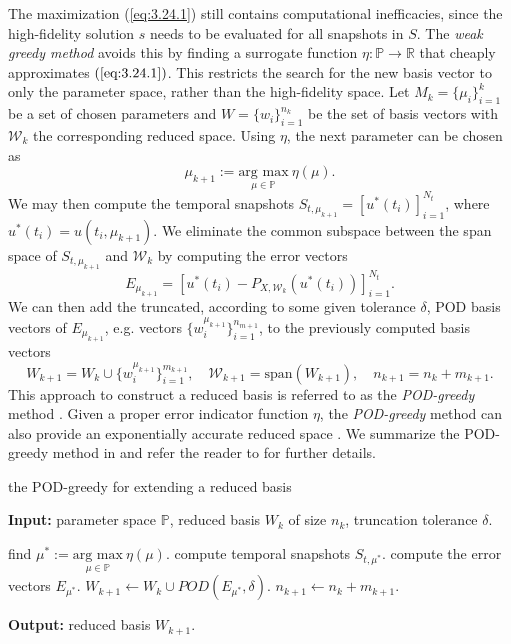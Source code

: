The maximization (\ref{eq:3.24.1}) still contains computational inefficacies, since the high-fidelity solution $s$ needs to be evaluated for all snapshots in $S$. The \emph{weak greedy method} avoids this by finding a surrogate function $\eta:\mathbb P \to \mathbb R$ that cheaply approximates $(\ref{eq:3.24.1})$. This restricts the search for the new basis vector to only the parameter space, rather than the high-fidelity space. Let $M_k=\{\mu_i\}_{i=1}^k$ be a set of chosen parameters and $W = \{ w_i\}_{i=1}^{n_k}$ be the set of basis vectors with $\mathcal W_k$ the corresponding reduced space. Using $\eta$, the next parameter can be chosen as
\begin{equation}
	\mu_{k+1} := \underset{\mu \in \mathbb P}{\text{arg\ max}} \ \eta(\mu).
\end{equation}
We may then compute the temporal snapshots $S_{t,\mu_{k+1}} = [ u^*(t_i) ]_{i=1}^{N_t}$, where $u^*(t_i) = u(t_i,\mu_{k+1})$. We eliminate the common subspace between the span space of $S_{t,\mu_{k+1}}$ and $\mathcal W_k$ by computing the error vectors 
\begin{equation}
	E_{\mu_{k+1}} = \left[ u^*(t_i) - P_{X,\mathcal W_k} (u^*(t_i)) \right]_{i=1}^{N_t}.
\end{equation}
We can then add the truncated, according to some given tolerance $\delta$, POD basis vectors of $E_{\mu_{k+1}}$, e.g. vectors $\{w^{\mu_{k+1}}_i\}_{i=1}^{n_{m+1}}$, to the previously computed basis vectors
\begin{equation}
	W_{k+1} = W_{k} \cup \{w^{\mu_{k+1}}_i\}_{i=1}^{m_{k+1}}, \quad \mathcal W_{k+1} = \text{span}(W_{k+1}), \quad n_{k+1} = n_k + m_{k+1}.
\end{equation}
This approach to construct a reduced basis is referred to as the \emph{POD-greedy} method \cite{haasdonk2008reduced}. Given a proper error indicator function $\eta$, the \emph{POD-greedy} method can also provide an exponentially accurate reduced space \cite{haasdonk2008reduced,haasdonk2013convergence}. We summarize the POD-greedy method in  and refer the reader to \cite{hesthaven2015certified,haasdonk2013convergence} for further details.

\begin{algorithm} 
	\caption{the POD-greedy for extending a reduced basis} \label{alg:3.3.1}
	\textbf{Input:} parameter space $\mathbb P$, reduced basis $W_k$ of size $n_k$, truncation tolerance $\delta$.
	\begin{algorithmic} [1]
		\State find $\mu^* := \underset{\mu \in \mathbb P}{\text{arg\ max}} \ \eta(\mu)$.
		\State compute temporal snapshots $S_{t,\mu^*}$.
		\State compute the error vectors $E_{\mu^*}$.
		\State $W_{k+1} \leftarrow W_{k} \cup POD(E_{\mu^*},\delta)$.
		\State $n_{k+1} \leftarrow n_k + m_{k+1}$.
	\end{algorithmic}
	\vspace{0.5cm}
	\textbf{Output:} reduced basis $W_{k+1}$.
\end{algorithm}




